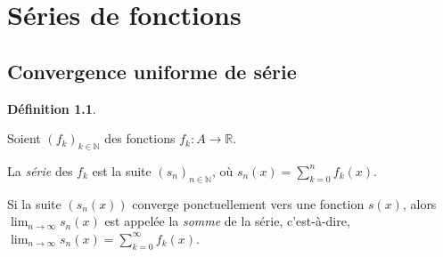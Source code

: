 \documentclass{report}
\newcommand*{\dsum}[4]{\displaystyle\sum_{#1=#2}^{#3}#4}
\newcommand*{\dlim}[3]{\displaystyle\lim_{#1 \to #2}#3}
\newcommand*{\reels}{\mathbb{R}}
\newcommand*{\naturels}{\mathbb{N}}
\theoremstyle{definition}
\newtheorem*{defin}{D\'efinition}
\theoremstyle{remark}
\begin{document}
	\chapter{S\'eries de fonctions}
	\section{Convergence uniforme de s\'erie}
	\begin{defin}~

		Soient $(f_k)_{k \in \naturels}$ des fonctions $f_k:A \to \reels$.

		La \emph{s\'erie} des $f_k$ est la suite $(s_n)_{n \in \naturels}$, o\`u $s_n(x) = \dsum{k}{0}{n}{f_k(x)}$.

		Si la suite $(s_n(x))$ converge ponctuellement vers une fonction $s(x)$, alors $\dlim{n}{\infty}{s_n(x)}$ est appel\'ee la \emph{somme} de la s\'erie, c'est-\`a-dire, $\dlim{n}{\infty}{s_n(x)} = \dsum{k}{0}{\infty}{f_k(x)}$.
	\end{defin}
\end{document}
